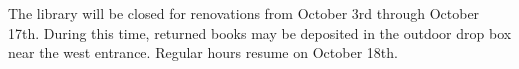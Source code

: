 \documentclass[11pt]{article}
\begin{document}
The library will be closed for renovations from October 3rd through October
17th. During this time, returned books may be deposited in the outdoor drop
box near the west entrance. Regular hours resume on October 18th.
\end{document}
